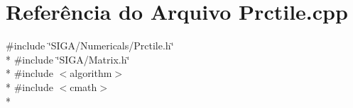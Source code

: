 \section{Referência do Arquivo Prctile.\+cpp}
\label{_prctile_8cpp}
{\ttfamily \#include \char`\"{}S\+I\+G\+A/\+Numericals/\+Prctile.\+h\char`\"{}}\\*
{\ttfamily \#include \char`\"{}S\+I\+G\+A/\+Matrix.\+h\char`\"{}}\\*
{\ttfamily \#include $<$algorithm$>$}\\*
{\ttfamily \#include $<$cmath$>$}\\*
